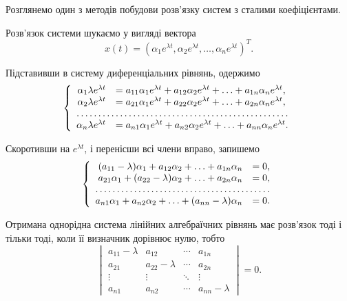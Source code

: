Розглянемо один з методів побудови розв'язку систем з сталими коефіцієнтами. \parvskip

Розв'язок системи шукаємо у вигляді вектора \[x(t) = (\alpha_1 e^{\lambda t}, \alpha_2 e^{\lambda t}, \ldots, \alpha_n e^{\lambda t})^T. \]

Підставивши в систему диференціальних рівнянь, одержимо
\begin{equation*}
	\left\{
		\begin{array}{rl}
			\alpha_1 \lambda e^{\lambda t} &= a_{11} \alpha_1 e^{\lambda t} + a_{12} \alpha_2  e^{\lambda t} + \ldots + a_{1n} \alpha_n e^{\lambda t}, \\
			\alpha_2 \lambda e^{\lambda t} &= a_{21} \alpha_1 e^{\lambda t} + a_{22} \alpha_2 e^{\lambda t} + \ldots + a_{2n} \alpha_n e^{\lambda t}, \\
			\hdotsfor{2} \\
			\alpha_n \lambda e^{\lambda t} &= a_{n1} \alpha_1 e^{\lambda t} + a_{n2} \alpha_2 e^{\lambda t} + \ldots + a_{nn} \alpha_n e^{\lambda t}.
		\end{array}
	\right.
\end{equation*}
 
Скоротивши на $e^{\lambda t}$, і перенісши всі члени вправо, запишемо
\begin{equation*}
	\left\{
		\begin{array}{rl}
			(a_{11} - \lambda) \alpha_1 + a_{12} \alpha_2 + \ldots + a_{1n} \alpha_n &= 0, \\
			a_{21} \alpha_1 + (a_{22} - \lambda) \alpha_2 + \ldots + a_{2n} \alpha_n &= 0, \\
			\hdotsfor{2} \\
			a_{n1} \alpha_1 + a_{n2} \alpha_2 + \ldots + (a_{nn} - \lambda) \alpha_n &= 0.
		\end{array}
	\right.
\end{equation*}
 
Отримана однорідна система лінійних алгебраїчних рівнянь має роз\-в'яз\-ок тоді і тільки тоді, коли її визначник дорівнює нулю, тобто
\begin{equation*}
	\begin{vmatrix}
		a_{11} - \lambda & a_{12} & \cdots & a_{1n} \\
		a_{21} & a_{22} - \lambda & \cdots & a_{2n} \\
		\vdots & \vdots & \ddots & \vdots \\
		a_{n1} & a_{n2} & \cdots & a_{nn} - \lambda
	\end{vmatrix} = 0.
\end{equation*}

